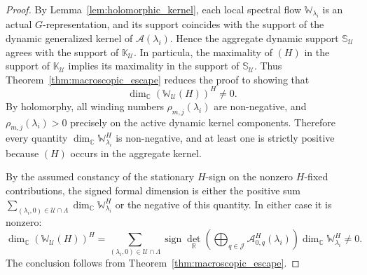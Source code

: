 \documentclass[twoside,11pt]{article}
\def\bc{{\mathbb{C}}}
\def\br{{\mathbb{R}}}
\begin{document}
\begin{proof}
By Lemma~\ref{lem:holomorphic_kernel}, each local spectral flow $\mathbb W_{\lambda_i}$ is an actual $G$-representation, and its support coincides with the support of the dynamic generalized kernel of $\mathscr A(\lambda_i)$. Hence the aggregate dynamic support $\mathbb S_{\mathcal U}$ agrees with the support of $\mathbb K_{\mathcal U}$. In particula, the maximality of $(H)$ in the support of $\mathbb K_{\mathcal U}$ implies its maximality in the support of $\mathbb S_{\mathcal U}$. Thus Theorem~\ref{thm:macroscopic_escape} reduces the proof to showing that
\[
\dim_\bc
\left(
\mathbb W_{\mathcal U}(H)
\right)^H
\neq 0.
\]
By holomorphy, all winding numbers $\rho_{m,j}(\lambda_i)$ are non-negative, and $\rho_{m,j}(\lambda_i)>0$ precisely on the active dynamic kernel components. Therefore every quantity $\dim_\bc\mathbb W_{\lambda_i}^H$ is non-negative, and at least one is strictly positive because $(H)$ occurs in the aggregate kernel.

By the assumed constancy of the stationary $H$-sign on the nonzero $H$-fixed contributions, the signed formal dimension is either the positive sum $\sum_{(\lambda_i,0)\in\mathcal U\cap\Lambda} \dim_\bc\mathbb W_{\lambda_i}^H$ or the negative of this quantity. In either case it is nonzero:
\[
\dim_\bc \left( \mathbb W_{\mathcal U}(H) \right)^H
=
\sum_{(\lambda_i,0)\in\mathcal U\cap\Lambda}
\operatorname{sign}\det_\br \left(
\bigoplus_{q\in\mathcal J} \mathscr A_{0,q}^H(\lambda_i) \right) \dim_\bc\mathbb W_{\lambda_i}^H \neq 0.
\]
The conclusion follows from Theorem~\ref{thm:macroscopic_escape}.
\end{proof}
\end{document}
